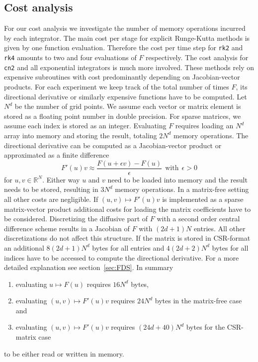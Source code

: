 \documentclass{scrartcl}
\begin{document}
\subsection{Cost analysis}
	For our cost analysis we investigate the number of memory operations incurred by each integrator. The main cost per stage for explicit Runge-Kutta methods is given by one function evaluation. Therefore the cost per time step for \texttt{rk2} and \texttt{rk4} amounts to two and four evaluations of $F$ respectively. The cost analysis for \texttt{cn2} and all exponential integrators is much more involved. These methods rely on expensive subroutines with cost predominantly depending on Jacobian-vector products. For each experiment we keep track of the total number of times $F$, its directional derivative or similarly expensive functions have to be computed.
	Let $N^d$ be the number of grid points. We assume each vector or matrix element is stored as a floating point number in double precision. For sparse matrices, we assume each index is stored as an integer. Evaluating $F$ requires loading an $N^d$ array into memory and storing the result, totaling $2N^d$ memory operations. The directional derivative can be computed as a Jacobian-vector product or approximated as a finite difference 
	\[
	F'(u)v \approx \frac{F(u+\epsilon v)-F(u)}{\epsilon} ~~\text{with}~~ \epsilon > 0
	\]
	for $u, v\in\mathbb{R}^{N}$.
	Either way $u$ and $v$ need to be loaded into memory and the result needs to be stored, resulting in $3N^d$ memory operations. In a matrix-free setting all other costs are negligible. If $(u,v)\mapsto F'(u)v$ is implemented as a sparse matrix-vector product additional costs for loading the matrix coefficients have to be considered. Discretizing the diffusive part of $F$ with a second order central difference scheme results in a Jacobian of $F$ with $(2d+1)N$ entries. All other discretizations do not affect this structure. If the matrix is stored in CSR-format an additional $8(2d+1)N^d$ bytes for all entries and $4(2d+2)N^d$ bytes for all indices have to be accessed to compute the directional derivative. For a more detailed explanation see section~\ref{sec:FDS}.
	In summary
	\begin{enumerate}
		\item evaluating $u \mapsto F(u)$ requires $16N^d$ bytes,
		\item evaluating $(u,v) \mapsto F'(u)v$ requires $24N^d$ bytes in the matrix-free case and
		\item evaluating $(u,v) \mapsto F'(u)v$ requires $(24d+40)N^d$ bytes for the CSR-matrix case
	\end{enumerate}
	to be either read or written in memory. 
	
\end{document}
